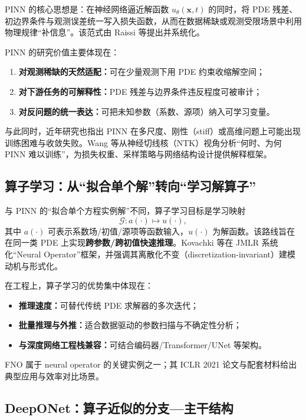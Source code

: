 PINN 的核心思想是：在神经网络逼近解函数 $u_{\theta}(\mathbf{x},t)$ 的同时，将 PDE 残差、初边界条件与观测误差统一写入损失函数，从而在数据稀缺或观测受限场景中利用物理规律“补信息”。该范式由 Raissi 等提出并系统化\cite{raissi2019pinn}。

PINN 的研究价值主要体现在：
\begin{enumerate}
  \item \textbf{对观测稀缺的天然适配：}可在少量观测下用 PDE 约束收缩解空间；
  \item \textbf{对下游任务的可解释性：}PDE 残差与边界条件违反程度可被审计；
  \item \textbf{对反问题的统一表达：}可把未知参数（系数、源项）纳入可学习变量。
\end{enumerate}

与此同时，近年研究也指出 PINN 在多尺度、刚性（stiff）或高维问题上可能出现训练困难与收敛失败。Wang 等从神经切线核（NTK）视角分析“何时、为何 PINN 难以训练”，为损失权重、采样策略与网络结构设计提供解释框架\cite{wang2022pinn_ntk}。


\subsection{算子学习：从“拟合单个解”转向“学习解算子”}\label{subsec:rw_operator}

与 PINN 的“拟合单个方程实例解”不同，算子学习目标是学习映射
\begin{equation}
\mathcal{G}: a(\cdot)\mapsto u(\cdot),
\end{equation}
其中 $a(\cdot)$ 可表示系数场/初值/源项等函数输入，$u(\cdot)$ 为解函数。该路线旨在在同一类 PDE 上实现\textbf{跨参数/跨初值快速推理}。Kovachki 等在 JMLR 系统化“Neural Operator”框架，并强调其离散化不变（discretization-invariant）建模动机与形式化\cite{kovachki2023neural_operator}。

在工程上，算子学习的优势集中体现在：
\begin{itemize}
  \item \textbf{推理速度：}可替代传统 PDE 求解器的多次迭代；
  \item \textbf{批量推理与外推：}适合数据驱动的参数扫描与不确定性分析；
  \item \textbf{与深度网络工程栈兼容：}可结合编码器/Transformer/UNet 等架构。
\end{itemize}

FNO 属于 neural operator 的关键实例之一；其 ICLR 2021 论文与配套材料给出典型应用与效率对比场景\cite{li2021fno}。


\subsection{DeepONet：算子近似的分支—主干结构}\label{subsec:rw_deeponet}

